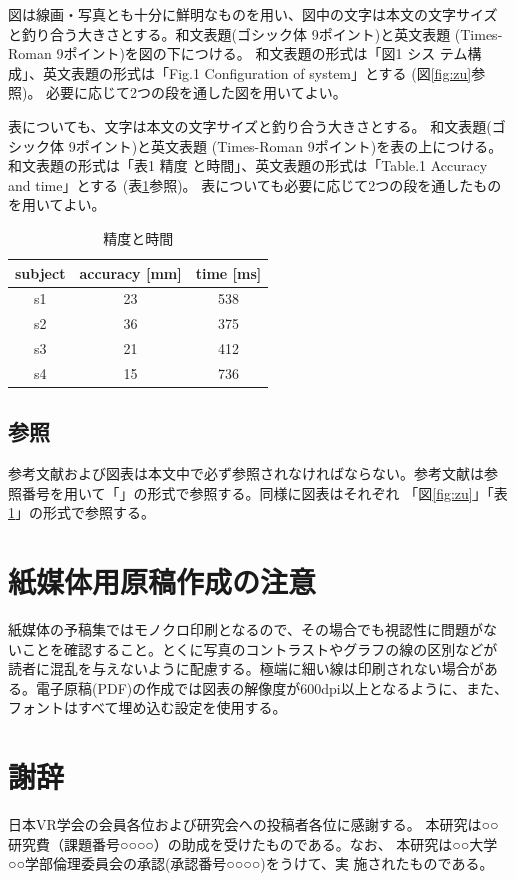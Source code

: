 \documentclass[a4paper,twoside]{jarticle}
\begin{document}
図は線画・写真とも十分に鮮明なものを用い、図中の文字は本文の文字サイズ
と釣り合う大きさとする。和文表題(ゴシック体 9ポイント)と英文表題
(Times-Roman 9ポイント)を図の下につける。 和文表題の形式は「図1 シス
テム構成」、英文表題の形式は「Fig.1 Configuration of system」とする
(図\ref{fig:zu}参照)。
必要に応じて2つの段を通した図を用いてよい。

表についても、文字は本文の文字サイズと釣り合う大きさとする。
和文表題(ゴシック体 9ポイント)と英文表題
(Times-Roman 9ポイント)を表の上につける。 和文表題の形式は「表1 精度
と時間」、英文表題の形式は「Table.1 Accuracy and time」とする
(表\ref{tab:ta}参照)。
表についても必要に応じて2つの段を通したものを用いてよい。

\begin{table}[ht]
\caption{精度と時間}
\label{tab:ta}
\begin{center}
\begin{tabular}{|c|c|c|}
\hline
subject & accuracy [mm] & time [ms]\\ \hline
s1      & 23       & 538  \\ \hline
s2      & 36       & 375  \\ \hline
s3      & 21       & 412  \\ \hline
s4      & 15       & 736  \\ \hline
\end{tabular}
\end{center}
\end{table}

\subsection{参照}
参考文献および図表は本文中で必ず参照されなければならない。参考文献は参
照番号を用いて「\cite{bib1}」の形式で参照する。同様に図表はそれぞれ
「図\ref{fig:zu}」「表\ref{tab:ta}」の形式で参照する。

\section{紙媒体用原稿作成の注意}

紙媒体の予稿集ではモノクロ印刷となるので、その場合でも視認性に問題がな
いことを確認すること。とくに写真のコントラストやグラフの線の区別などが
読者に混乱を与えないように配慮する。極端に細い線は印刷されない場合があ
る。電子原稿(PDF)の作成では図表の解像度が600dpi以上となるように、また、
フォントはすべて埋め込む設定を使用する。

\section*{謝辞}
日本VR学会の会員各位および研究会への投稿者各位に感謝する。
本研究は○○研究費（課題番号○○○○）の助成を受けたものである。なお、
本研究は○○大学○○学部倫理委員会の承認(承認番号○○○○)をうけて、実
施されたものである。
\end{document}
